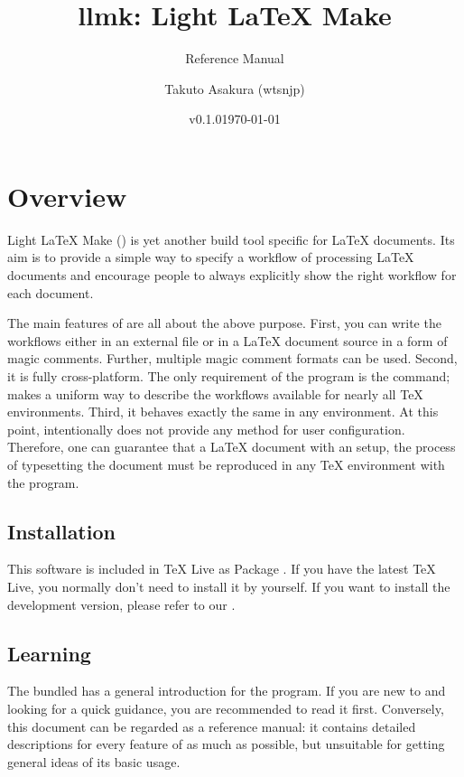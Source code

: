 \documentclass[draft]{llmk-doc}
\title{llmk: Light {\LaTeX} Make}
\author{Takuto Asakura (wtsnjp)}
\subtitle{Reference Manual}
\date{v0.1.0\quad\today}
\begin{document}
\maketitle

\section{Overview}

Light {\LaTeX} Make () is yet another build tool specific for
{\LaTeX} documents. Its aim is to provide a simple way to specify a workflow of
processing {\LaTeX} documents and encourage people to always explicitly show
the right workflow for each document.

The main features of  are all about the above purpose. First, you
can write the workflows either in an external file  or in a
{\LaTeX} document source in a form of magic comments. Further, multiple magic
comment formats can be used. Second, it is fully cross-platform. The only
requirement of the program is the  command;  makes a
uniform way to describe the workflows available for nearly all {\TeX}
environments. Third, it behaves exactly the same in any environment. At this
point,  intentionally does not provide any method for user
configuration. Therefore, one can guarantee that a {\LaTeX} document with an
 setup, the process of typesetting the document must be reproduced
in any {\TeX} environment with the program.

\subsection{Installation}

This software is included in {\TeX} Live as Package . If
you have the latest {\TeX} Live, you normally don't need to install it by
yourself. If you want to install the development version, please refer to our
{\README}.

\subsection{Learning }

The bundled {\README} has a general introduction for the program. If you are
new to  and looking for a quick guidance, you are recommended to
read it first. Conversely, this document can be regarded as a reference manual:
it contains detailed descriptions for every feature of  as much as
possible, but unsuitable for getting general ideas of its basic usage.
\end{document}
